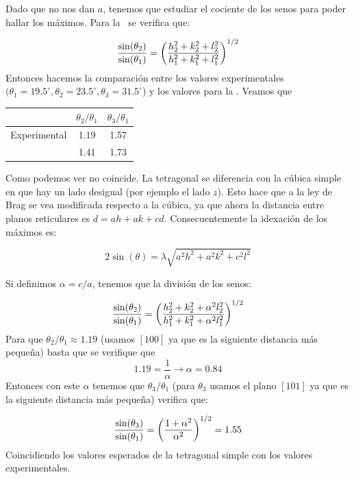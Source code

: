 \begin{solucion}
	Dado que no nos dan $a$, tenemos que estudiar el cociente de los senos para poder hallar los máximos. Para la \sc \ se verifica que:
	
	\begin{equation*}
		\frac{\sin(\theta_2)}{\sin (\theta_1)} = \left( \frac{h_2^2 + k_2^2 + l_2^2}{h_1^2 + k_1^2 + l_1^2} \right)^{1/2}
	\end{equation*}
	Entonces hacemos la comparación entre los valores experimentales $(\theta_1=19.5^\circ,\theta_2=23.5^\circ,\theta_3=31.5^\circ$) y los valores para la \sc. Veamos que 
	\begin{center}
		 \begin{tabular}{c|c|c}
		 	& $\theta_2/\theta_1$ & $\theta_3/\theta_1$ \\ \hline
		 	Experimental &  1.19 & 1.57  \\ 
		 	\sc  & 1.41 & 1.73
		 \end{tabular}
	\end{center}
	Como podemos ver no coincide. La tetragonal se diferencia con la cúbica simple en que hay un lado desigual (por ejemplo el lado $z$). Esto hace que a la ley de Brag se vea modificada respecto a la cúbica, ya que ahora la distancia entre planos reticulares es $d=ah+ak+cd$. Consecuentemente la idexación de los máximos es:
	
	\begin{equation*}
		2 \sin (\theta) = \lambda \sqrt{a^2 h^2 + a^2 k^2 + c^2 l^2}
	\end{equation*}
	
	
	Si definimos $\alpha=c/a$, tenemos que la división de los senos: 
	
	\begin{equation*}
		\frac{\sin(\theta_2)}{\sin (\theta_1)} = \left( \frac{h_2^2 + k_2^2 + \alpha^2 l_2^2}{h_1^2 + k_1^2 + \alpha^2 l_1^2} \right)^{1/2}
	\end{equation*} 
	Para que $\theta_2/\theta_1\approx 1.19$ (usamos $[100]$ ya que es la siguiente distancia más pequeña) basta que se verifique que 
	\begin{equation*}
		1.19 = \frac{1}{\alpha} \rightarrow \alpha = 0.84
	\end{equation*}
	Entonces con este $\alpha$ tenemos que $\theta_3/\theta_1$ (para $\theta_3 $ usamos el plano $[101]$ ya que es la siguiente distancia más pequeña) verifica que:
	
	\begin{equation*}
		\frac{\sin(\theta_3)}{\sin (\theta_1)} = \left( \frac{1+\alpha^2}{\alpha^2} \right)^{1/2} = 1.55  		
	\end{equation*}
	Coincidiendo los valores esperados de la tetragonal simple con los valores experimentales.
\end{solucion}


